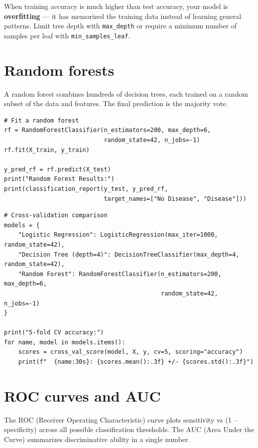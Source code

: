 \begin{pythontip}
When training accuracy is much higher than test accuracy, your model is \textbf{overfitting} --- it has memorized the training data instead of learning general patterns. Limit tree depth with \texttt{max\_depth} or require a minimum number of samples per leaf with \texttt{min\_samples\_leaf}.
\end{pythontip}

\section{Random forests}

A random forest combines hundreds of decision trees, each trained on a random subset of the data and features. The final prediction is the majority vote.

\begin{verbatim}
# Fit a random forest
rf = RandomForestClassifier(n_estimators=200, max_depth=6,
                            random_state=42, n_jobs=-1)
rf.fit(X_train, y_train)

y_pred_rf = rf.predict(X_test)
print("Random Forest Results:")
print(classification_report(y_test, y_pred_rf,
                            target_names=["No Disease", "Disease"]))
\end{verbatim}

\begin{verbatim}
# Cross-validation comparison
models = {
    "Logistic Regression": LogisticRegression(max_iter=1000, random_state=42),
    "Decision Tree (depth=4)": DecisionTreeClassifier(max_depth=4, random_state=42),
    "Random Forest": RandomForestClassifier(n_estimators=200, max_depth=6,
                                            random_state=42, n_jobs=-1)
}

print("5-fold CV accuracy:")
for name, model in models.items():
    scores = cross_val_score(model, X, y, cv=5, scoring="accuracy")
    print(f"  {name:30s}: {scores.mean():.3f} +/- {scores.std():.3f}")
\end{verbatim}

\section{ROC curves and AUC}

The ROC (Receiver Operating Characteristic) curve plots sensitivity vs (1 -- specificity) across all possible classification thresholds. The AUC (Area Under the Curve) summarizes discriminative ability in a single number.

